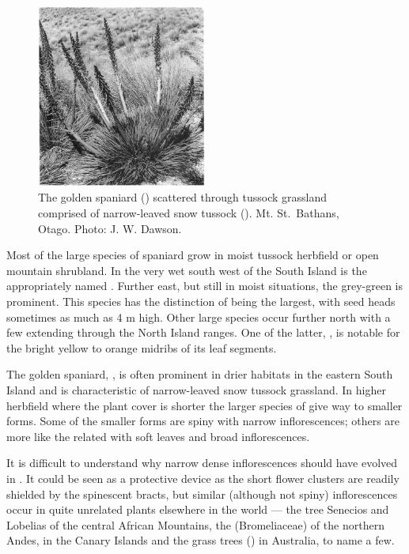 \begin{figure}
	\includegraphics[width=0.5\textwidth]{graphics/figure98golden-spaniard.jpg}
	\centering
	\caption[The golden spaniard]{The golden spaniard () scattered through tussock grassland comprised of narrow-leaved snow tussock (). Mt. St.\ Bathans, Otago.
	Photo: J. W. Dawson.}%
	\label{fig:98golden-spaniard}
\end{figure}

Most of the large species of spaniard grow in moist tussock herbfield or open mountain shrubland.
In the very wet south west of the South Island is the appropriately named .
Further east, but still in moist situations, the grey-green  is prominent.
This species has the distinction of being the largest, with seed heads sometimes as much as 4 m high.
Other large species occur further north with a few extending through the North Island ranges.
One of the latter, , is notable for the bright yellow to orange midribs of its leaf segments.

The golden spaniard, , is often prominent in drier habitats in the eastern South Island and is characteristic of narrow-leaved snow tussock grassland.
In higher herbfield where the plant cover is shorter the larger species of  give way to smaller forms.
Some of the smaller forms are spiny with narrow inflorescences; others are more like the related  with soft leaves and broad inflorescences.

It is difficult to understand why narrow dense inflorescences should have evolved in .
It could be seen as a protective device as the short flower clusters are readily shielded by the spinescent bracts, but similar (although not spiny) inflorescences occur in quite unrelated plants elsewhere in the world --- the tree Senecios and Lobelias of the central African Mountains, the  (Bromeliaceae) of the northern Andes,  in the Canary Islands and the grass trees () in Australia, to name a few.

